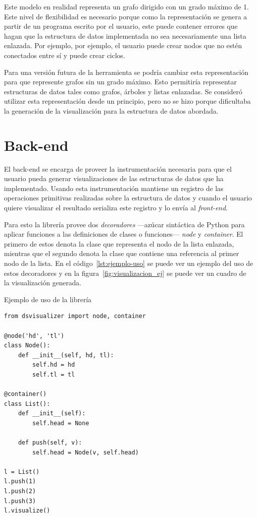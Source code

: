 Este modelo en realidad representa un grafo dirigido con un grado máximo de 1. Este nivel de flexibilidad es necesario porque como la representación se genera a partir de un programa escrito por el usuario, este puede contener errores que hagan que la estructura de datos implementada no sea necesariamente una lista enlazada. Por ejemplo, por ejemplo, el usuario puede crear nodos que no estén conectados entre sí y puede crear ciclos.

Para una versión futura de la herramienta se podría cambiar esta representación para que represente grafos sin un grado máximo. Esto permitiría representar estructuras de datos tales como grafos, árboles y listas enlazadas. Se consideró utilizar esta representación desde un principio, pero no se hizo porque dificultaba la generación de la visualización para la estructura de datos abordada.

\section{Back-end}

El back-end se encarga de proveer la instrumentación necesaria para que el usuario pueda generar visualizaciones de las estructuras de datos que ha implementado. Usando esta instrumentación mantiene un registro de las operaciones primitivas realizadas sobre la estructura de datos y cuando el usuario quiere visualizar el resultado serializa este registro y lo envía al \textit{front-end}.

Para esto la librería provee dos \textit{decoradores} ---azúcar sintáctica de Python para aplicar funciones a las definiciones de clases o funciones--- \textit{node} y \textit{container}. El primero de estos denota la clase que representa el nodo de la lista enlazada, mientras que el segundo denota la clase que contiene una referencia al primer nodo de la lista. En el código~\ref{lst:ejemplo-uso} se puede ver un ejemplo del uso de estos decoradores y en la figura~\ref{fig:visualizacion_ej} se puede ver un cuadro de la visualización generada.

\begin{listing}[htb]
\caption{Ejemplo de uso de la librería}
\label{lst:ejemplo-uso}
\begin{verbatim}
from dsvisualizer import node, container

@node('hd', 'tl')
class Node():
    def __init__(self, hd, tl):
        self.hd = hd
        self.tl = tl

@container()
class List():
    def __init__(self):
        self.head = None

    def push(self, v):
        self.head = Node(v, self.head)

l = List()
l.push(1)
l.push(2)
l.push(3)
l.visualize()
\end{verbatim}
\end{listing}

